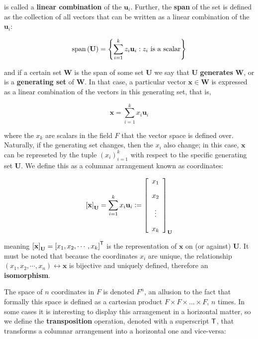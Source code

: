 	\noindent is called a \textbf{linear combination} of the $\mathbf{u}_i$. Further, the \textbf{span} of the set is defined as the collection of all vectors that can be written as a linear combination of the $\mathbf{u}_i$:

\begin{equation} \operatorname{span}\left(\mathbf{U}\right) = \left\{\sum\limits_{i=1}^k z_i\mathbf{u}_i : z_i\text{ is a scalar}\right\}\end{equation}
	
	\noindent and if a certain set $\mathbf{W}$ is the span of some set $\mathbf{U}$ we say that $\mathbf{U}$ \textbf{generates} $\mathbf{W}$, or is a \textbf{generating set} of $\mathbf{W}$. In that case, a particular vector $\mathbf{x}\in\mathbf{W}$ is expressed as a linear combination of the vectors in this generating set, that is,

\begin{equation} \mathbf{x} = \sum_{i=1}^k x_i\mathbf{u}_i\end{equation}

	\noindent where the $x_k$ are scalars in the field $F$ that the vector space is defined over. Naturally, if the generating set changes, then the $x_i$ also change; in this case, $\mathbf{x}$ can be represeted by the tuple $\left(x_i\right)_{i=1}^k$ with respect to the specific generating set $\mathbf{U}$. We define this as a columnar arrangement known as coordinates:

\begin{equation} \left[\mathbf{x}\right]_\mathbf{U} = \sum\limits_{i=1}^k x_i \mathbf{u}_i \vcentcolon = \left[\begin{array}{c} x_1 \\[3mm] x_2 \\[3mm] \vdots \\[3mm] x_k \end{array}\right]_{\mathbf{U}}\end{equation}

	\noindent meaning $\left[\mathbf{x}\right]_{\mathbf{U}} = \left[x_1,x_2,\cdots,x_k\right]^{\mathsf{T}}$ is the representation of $\mathbf{x}$ on (or against) $\mathbf{U}$. It must be noted that because the coordinates $x_i$ are unique, the relationship $\left(x_1,x_2,\cdots,x_n\right) \leftrightarrow \mathbf{x}$ is bijective and uniquely defined, therefore an \textbf{isomorphism}.

	The space of $n$ coordinates in $F$ is denoted $F^n$, an allusion to the fact that formally this space is defined as a cartesian product $F\times F\times ... \times F$, $n$ times. In some cases it is interesting to display this arrangement in a horizontal matter, so we define the \textbf{transposition} operation, denoted with a superscript ${\mathsf{T}}$, that transforms a columnar arrangement into a horizontal one and vice-versa:

